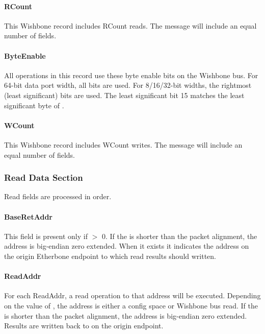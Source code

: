 \documentclass{article}
\begin{document}
\paragraph{RCount} \label{field:RCount}
This Wishbone record includes RCount reads.
The message will include an equal number of  fields.

\paragraph{ByteEnable} \label{field:ByteEnable}
All operations in this record use these byte enable bits on the Wishbone bus.
For 64-bit data port width, all bits are used.
For 8/16/32-bit widths, the rightmost (least significant) bits are used.
The least significant bit 15 matches the least significant byte of .

\paragraph{WCount} \label{field:WCount}
This Wishbone record includes WCount writes.
The message will include an equal number of  fields.

\subsubsection{Read Data Section}

Read fields are processed in order.

\paragraph{BaseRetAddr} \label{field:BaseRetAddr}
This field is present only if  $>$ 0.
If the  is shorter than the packet alignment, 
the address is big-endian zero extended.
When it exists it indicates the address on the origin Etherbone endpoint 
to which read results should written.

\paragraph{ReadAddr} \label{field:ReadAddr}
For each ReadAddr, 
a read operation to that address will be executed.
Depending on the value of ,
the address is either a config space or Wishbone bus read.
If the  is shorter than the packet alignment, 
the address is big-endian zero extended.
Results are written back to  on the origin endpoint.
\end{document}

